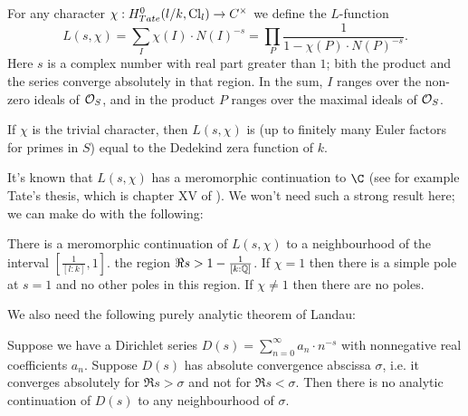 \begin{definition}
	For any character $\chi : H^0_{Tate}(l/k,\mathrm{Cl}_l) \to C^\times$ we define the $L$-function
	\[
		L(s,\chi)
		=
		\sum_{I} \chi(I) \cdot N(I)^{-s}
		=
		\prod_{P} \frac{1}{1-\chi(P) \cdot N(P)^{-s}}.
	\]
	Here $s$ is a complex number with real part greater than $1$; bith the product and the series
	converge absolutely in that region.
	In the sum, $I$ ranges over the non-zero ideals of ${\mathcal O}_S$, and in the product $P$
	ranges over the maximal ideals of ${\mathcal O}_S$.

	If $\chi$ is the trivial character, then $L(s,\chi)$ is
	(up to finitely many Euler factors for primes in $S$)
	equal to the Dedekind zera function of $k$.
\end{definition}


It's known that $L(s,\chi)$ has a meromorphic continuation to $\C$
(see for example Tate's thesis, which is chapter XV of \cite{cassells frohlich}).
We won't need such a strong result here; we can make do with the following:

\begin{lemma}
	There is a meromorphic continuation of $L(s,\chi)$
	to a neighbourhood of the interval $[\frac{1}{[l:k]},1]$.
	the region $\Re s > 1-\frac{1}{[k:{\mathbb Q}]}$.
	If $\chi=1$ then there is a simple pole at $s=1$ and no other poles in this region.
	If $\chi \ne 1$ then there are no poles.
\end{lemma}


We also need the following purely analytic theorem of Landau:

\begin{theorem}
	Suppose we have a Dirichlet series $D(s) = \sum_{n=0}^\infty a_n \cdot n^{-s}$ with
	nonnegative real coefficients $a_n$.
	Suppose $D(s)$ has absolute convergence abscissa $\sigma$, i.e. it converges absolutely for $\Re s > \sigma$
	and not for $\Re s < \sigma$.
	Then there is no analytic continuation of $D(s)$ to any neighbourhood of $\sigma$.
\end{theorem}

